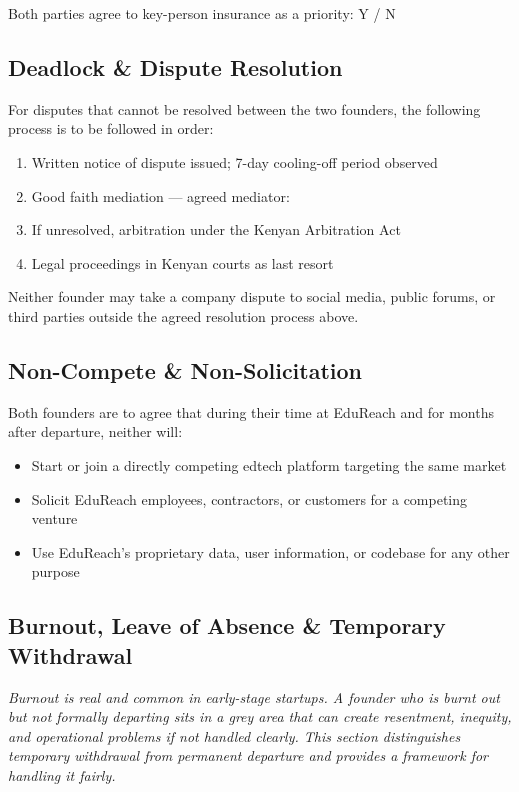 \documentclass[12pt,a4paper]{article}
\newcommand{\blank}[1][5.5cm]{\underline{\hspace{#1}}}
\begin{document}
\noindent Both parties agree to key-person insurance as a priority: \quad Y \;/\; N

\subsection{Deadlock \& Dispute Resolution}

For disputes that cannot be resolved between the two founders, the following process is to be followed in order:

\begin{enumerate}
  \item Written notice of dispute issued; 7-day cooling-off period observed
  \item Good faith mediation --- agreed mediator: \blank[5cm]
  \item If unresolved, arbitration under the Kenyan Arbitration Act
  \item Legal proceedings in Kenyan courts as last resort
\end{enumerate}

\noindent Neither founder may take a company dispute to social media, public forums, or third parties outside the agreed resolution process above.

\subsection{Non-Compete \& Non-Solicitation}

Both founders are to agree that during their time at EduReach and for \blank[1.5cm] months after departure, neither will:

\begin{itemize}
  \item Start or join a directly competing edtech platform targeting the same market
  \item Solicit EduReach employees, contractors, or customers for a competing venture
  \item Use EduReach's proprietary data, user information, or codebase for any other purpose
\end{itemize}

\subsection{Burnout, Leave of Absence \& Temporary Withdrawal}

\begin{notebox}
\textit{Burnout is real and common in early-stage startups. A founder who is burnt out but not formally departing sits in a grey area that can create resentment, inequity, and operational problems if not handled clearly. This section distinguishes temporary withdrawal from permanent departure and provides a framework for handling it fairly.}
\end{notebox}
\end{document}
